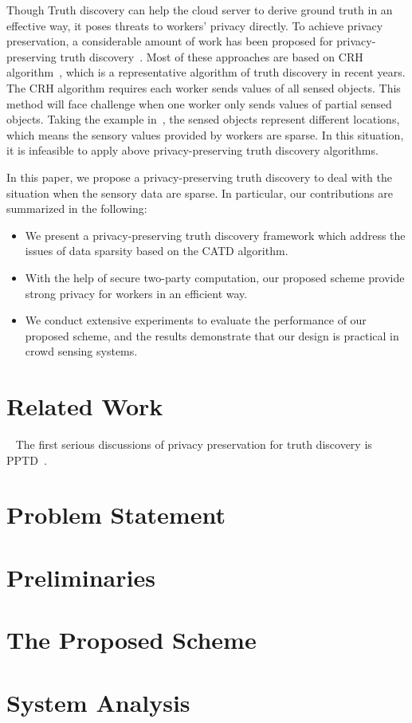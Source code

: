 \documentclass[conference]{IEEEtran}
\begin{document}
Though Truth discovery can help the cloud server to derive ground truth in an effective way, it poses threats to workers' privacy directly.
To achieve privacy preservation, a considerable amount of work has been proposed for privacy-preserving truth discovery~\cite{miao_cloud-enabled_2015,xu_efficient_2019,zhang_reliable_2019,xue_inpptd_2020}.
Most of these approaches are based on CRH algorithm~\cite{li_resolving_2014}, which is a representative algorithm of truth discovery in recent years.
The CRH algorithm requires each worker sends values of all sensed objects.
This method will face challenge when one worker only sends values of partial sensed objects.
Taking the example in~\cite{xia_quality-aware_2019}, the sensed objects represent different locations, which means the sensory values provided by workers are sparse.
In this situation, it is infeasible to apply above privacy-preserving truth discovery algorithms.

In this paper, we propose a privacy-preserving truth discovery to deal with the situation when the sensory data are sparse.
In particular, our contributions are summarized in the following:

\begin{itemize}
  \item We present a privacy-preserving truth discovery framework which address the issues of data sparsity based on the CATD algorithm.
  \item With the help of secure two-party computation, our proposed scheme provide strong privacy for workers in an efficient way.
  \item We conduct extensive experiments to evaluate the performance of our proposed scheme, and the results demonstrate that our design is practical in crowd sensing systems.
\end{itemize}


\section{Related Work}~\label{sec2}
The first serious discussions of privacy preservation for truth discovery is PPTD~\cite{miao_cloud-enabled_2015}.

\section{Problem Statement}

\section{Preliminaries}

\section{The Proposed Scheme}

\section{System Analysis}




\vspace{12pt}
\end{document}
